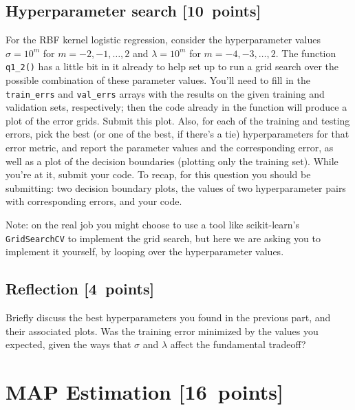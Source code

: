 \documentclass{article}
\newcommand{\blu}[1]{{\textcolor{blu}{#1}}}
\let\ask\blu
\newcommand\pts[1]{\textcolor{pointscolour}{[#1~points]}}
\begin{document}
\subsection{Hyperparameter search \pts{10}}

For the RBF kernel logistic regression, consider the hyperparameter values $\sigma=10^m$ for $m=-2,-1,\ldots,2$ and $\lambda=10^m$ for $m=-4,-3,\ldots,2$.
The function \verb|q1_2()| has a little bit in it already to help set up to run a grid search over the possible combination of these parameter values.
You'll need to fill in the \verb|train_errs| and \verb|val_errs| arrays
with the results on the given training and validation sets, respectively;
then the code already in the function will produce a plot of the error grids.
\ask{Submit this plot}.
Also, for each of the training and testing errors,
pick the best (or one of the best, if there's a tie) hyperparameters for that error metric,
and \ask{report the parameter values and the corresponding error, as well as a plot of the decision boundaries (plotting only the training set)}.
While you're at it, \ask{submit your code}.
To recap, for this question you should be submitting:
two decision boundary plots,
the values of two hyperparameter pairs with corresponding errors,
and your code.

Note: on the real job you might choose to use a tool like scikit-learn's \texttt{GridSearchCV} to implement the grid search, but here we are asking you to implement it yourself, by looping over the hyperparameter values.



\subsection{Reflection \pts{4}}
\ask{
Briefly discuss the best hyperparameters you found in the previous part, and their associated plots. Was the training error minimized by the values you expected, given the ways that $\sigma$ and $\lambda$ affect the fundamental tradeoff?
}

\clearpage
\section{MAP Estimation \pts{16}}
\end{document}
